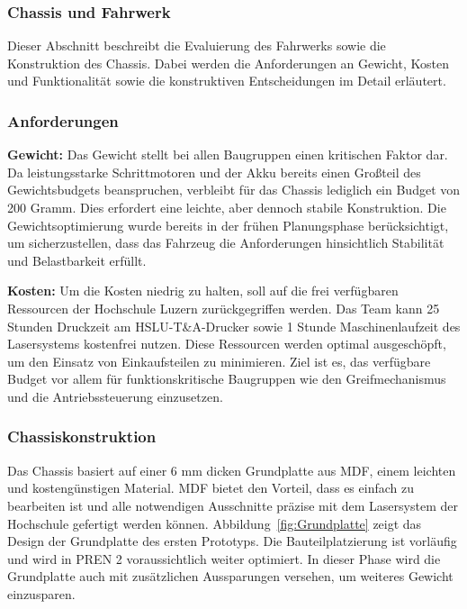 \documentclass[main.tex]{subfiles} %
\begin{document}

\subsubsection{Chassis und Fahrwerk}

Dieser Abschnitt beschreibt die Evaluierung des Fahrwerks sowie die Konstruktion des 
Chassis. Dabei werden die Anforderungen an Gewicht, Kosten und Funktionalität sowie 
die konstruktiven Entscheidungen im Detail erläutert.

\subsubsection*{Anforderungen}

\textbf{Gewicht:} \newline
Das Gewicht stellt bei allen Baugruppen einen kritischen Faktor dar. Da 
leistungsstarke Schrittmotoren und der Akku bereits einen Großteil des 
Gewichtsbudgets beanspruchen, verbleibt für das Chassis lediglich ein Budget von 
200 Gramm. Dies erfordert eine leichte, aber dennoch stabile Konstruktion. Die 
Gewichtsoptimierung wurde bereits in der frühen Planungsphase berücksichtigt, um 
sicherzustellen, dass das Fahrzeug die Anforderungen hinsichtlich Stabilität und 
Belastbarkeit erfüllt.



\textbf{Kosten:} \newline
Um die Kosten niedrig zu halten, soll auf die frei verfügbaren Ressourcen der 
Hochschule Luzern zurückgegriffen werden. Das Team kann 25 Stunden Druckzeit am 
HSLU-T\&A-Drucker sowie 1 Stunde Maschinenlaufzeit des Lasersystems kostenfrei 
nutzen. Diese Ressourcen werden optimal ausgeschöpft, um den Einsatz von 
Einkaufsteilen zu minimieren. Ziel ist es, das verfügbare Budget vor allem für 
funktionskritische Baugruppen wie den Greifmechanismus und die Antriebssteuerung 
einzusetzen.

\subsubsection*{Chassiskonstruktion}

Das Chassis basiert auf einer 6 mm dicken Grundplatte aus MDF, einem leichten und 
kostengünstigen Material. MDF bietet den Vorteil, dass es einfach zu bearbeiten ist 
und alle notwendigen Ausschnitte präzise mit dem Lasersystem der Hochschule gefertigt 
werden können. Abbildung~\ref{fig:Grundplatte} zeigt das Design der Grundplatte des 
ersten Prototyps. Die Bauteilplatzierung ist vorläufig und wird in PREN 2 
voraussichtlich weiter optimiert. In dieser Phase wird die Grundplatte auch mit 
zusätzlichen Aussparungen versehen, um weiteres Gewicht einzusparen.
\end{document}
